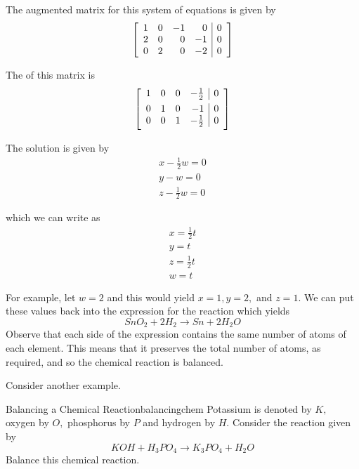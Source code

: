 The augmented matrix for this system of equations is given by 
\begin{equation*}
\left[ 
\begin{array}{rrrr|r}
1 & 0 & -1 & 0 & 0 \\ 
2 & 0 & 0 & -1 & 0 \\ 
0 & 2 & 0 & -2 & 0
\end{array}
\right]
\end{equation*}

The {\rref} of this matrix is 
\begin{equation*}
\leftB
\begin{array}{rrrr|r}
1 & 0 & 0 & -\vspace{0.05in}\frac{1}{2} & 0 \\ 
0 & 1 & 0 & -1 & 0 \\ 
0 & 0 & 1 & -\vspace{0.05in}\frac{1}{2} & 0
\end{array}
\rightB
\end{equation*}

The solution is given by 
\begin{equation*}
\begin{array}{c}
x - \frac{1}{2} w = 0 \\
y - w = 0 \\
z - \frac{1}{2}w = 0
\end{array}
\end{equation*} 

which we can write as 
\begin{equation*}
\begin{array}{c}
x = \frac{1}{2} t \\
y = t \\
z = \frac{1}{2}t \\
w = t
\end{array}
\end{equation*}

For example, let $w=2$ and this would yield $x=1,y=2,$ and $z=1.$ We can put these values back into 
the expression for the reaction which yields 
\begin{equation*}
SnO_{2}+2H_{2}\rightarrow Sn+2H_{2}O
\end{equation*}
Observe that each side of the expression contains the same number of atoms of each element. This means that 
it preserves the total number of atoms, as required, and so the chemical
reaction is balanced. 

Consider another example.

\begin{example}{Balancing a Chemical Reaction}{balancingchem}
Potassium is denoted by $K,$ oxygen by $O,$
phosphorus by $P$ and hydrogen by $H$. 
Consider the reaction given by
\begin{equation*}
KOH+H_{3}PO_{4}\rightarrow K_{3}PO_{4}+H_{2}O
\end{equation*}
Balance this chemical reaction.
\end{example}

